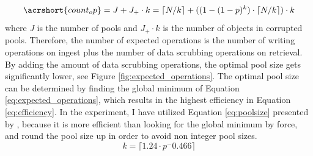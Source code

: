 \begin{equation}\label{eq:expected_operations}
    \acrshort{count_op} = J + J_+ \cdot k = \lceil N/k \rceil + ((1-(1-p)^k)\cdot \lceil N/k \rceil) \cdot k
\end{equation}
where \textit{J} is the number of pools and \textit{$J_+ \cdot k$} is the number of objects in corrupted pools. Therefore, the number of expected operations is the number of writing operations on ingest plus the number of data scrubbing operations on retrieval. By adding the amount of data scrubbing operations, the optimal pool size gets significantly lower, see Figure \ref{fig:expected_operations}. The optimal pool size  can be determined by finding the global minimum of Equation \ref{eq:expected_operations}, which results in the highest efficiency in Equation \ref{eq:efficiency}.
In the experiment, I have utilized Equation \ref{eq:poolsize} presented by \cite[3]{regen2020simple}, because it is more efficient than looking for the global minimum by force, and round the pool size up in order to avoid non integer pool sizes.
\begin{equation}\label{eq:poolsize}
    k = \lceil 1.24\cdot p^-0.466 \rceil
\end{equation}
